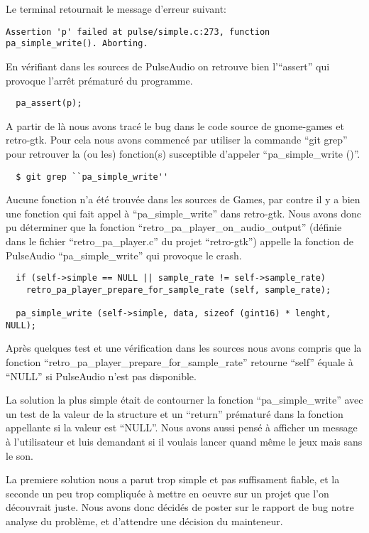 \documentclass[12pt]{report}
\begin{document}
Le terminal retournait le message d'erreur suivant:
\begin{verbatim}
Assertion 'p' failed at pulse/simple.c:273, function pa_simple_write(). Aborting.
\end{verbatim}

En vérifiant dans les sources de PulseAudio on retrouve bien l'``assert'' qui provoque
l’arrêt prématuré du programme.
\begin{verbatim}
  pa_assert(p);
\end{verbatim}

A partir de là nous avons tracé le bug dans le code source de gnome-games et retro-gtk.
Pour cela nous avons commencé par utiliser la commande ``git grep'' pour retrouver
la (ou les) fonction(s) susceptible d'appeler ``pa\_simple\_write ()''.
\begin{verbatim}
  $ git grep ``pa_simple_write''
\end{verbatim}

Aucune fonction n'a été trouvée dans les sources de Games, par contre il y a bien
une fonction qui fait appel à ``pa\_simple\_write'' dans retro-gtk.
Nous avons donc pu déterminer que la fonction
``retro\_pa\_player\_on\_audio\_output'' (définie dans le fichier
``retro\_pa\_player.c'' du projet ``retro-gtk'') appelle la fonction de PulseAudio
``pa\_simple\_write'' qui provoque le crash.

\begin{verbatim}
  if (self->simple == NULL || sample_rate != self->sample_rate)
    retro_pa_player_prepare_for_sample_rate (self, sample_rate);

  pa_simple_write (self->simple, data, sizeof (gint16) * lenght, NULL);
\end{verbatim}
  
Après quelques test et une vérification dans les sources nous  avons compris
que la fonction ``retro\_pa\_player\_prepare\_for\_sample\_rate'' retourne ``self''
équale à ``NULL'' si PulseAudio n'est pas disponible.

La solution la plus simple était de contourner la fonction ``pa\_simple\_write''
avec un test de la valeur de la structure et un ``return'' prématuré dans la fonction
appellante si la valeur est ``NULL''. Nous avons aussi pensé à afficher un message à
l'utilisateur et luis demandant si il voulais lancer quand même le jeux mais sans le son.

La premiere solution nous a parut trop simple et pas suffisament fiable, et la
seconde un peu trop compliquée à mettre en oeuvre sur un projet que l'on découvrait juste.
Nous avons donc décidés de poster sur le rapport de bug notre analyse du problème, et
d'attendre une décision du mainteneur.
\end{document}
